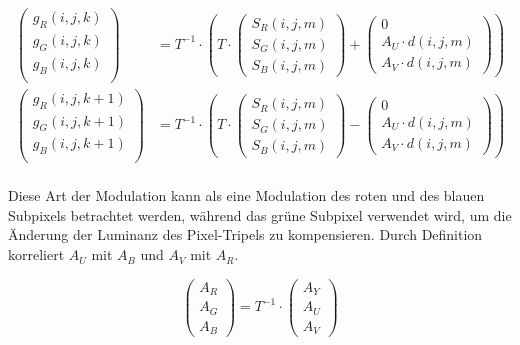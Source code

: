 \begin{equation}
\begin{split}
  \begin{pmatrix}
  g_R(i,j,k) \\
  g_G(i,j,k) \\
  g_B(i,j,k) \\
\end{pmatrix} &= T^{-1} \cdot \left( T \cdot \begin{pmatrix}
  S_R(i,j,m) \\
  S_G(i,j,m) \\
  S_B(i,j,m) 
  \end{pmatrix}  + \begin{pmatrix}
  0 \\
  A_U \cdot d(i,j,m) \\
  A_V \cdot d(i,j,m) 
  \end{pmatrix} \right) \\  
  \begin{pmatrix}
  g_R(i,j,k+1) \\
  g_G(i,j,k+1) \\
  g_B(i,j,k+1) \\
\end{pmatrix} &= T^{-1} \cdot \left( T \cdot \begin{pmatrix}
  S_R(i,j,m) \\
  S_G(i,j,m) \\
  S_B(i,j,m) 
  \end{pmatrix}  - \begin{pmatrix}
  0 \\
  A_U \cdot d(i,j,m) \\
  A_V \cdot d(i,j,m) 
  \end{pmatrix} \right) \\ 
\end{split}
\end{equation}

Diese Art der Modulation kann als eine Modulation des roten und des blauen Subpixels betrachtet werden, während das grüne Subpixel verwendet wird, um die Änderung der Luminanz des Pixel-Tripels zu kompensieren. Durch Definition korreliert $A_U$ mit $A_B$ und $A_V$ mit $A_R$.

\begin{equation}
   \begin{pmatrix}
   A_R \\
   A_G \\
   A_B
  \end{pmatrix}  = T^{-1} \cdot \begin{pmatrix}
   A_Y \\
   A_U \\
   A_V
  \end{pmatrix}
\end{equation}



